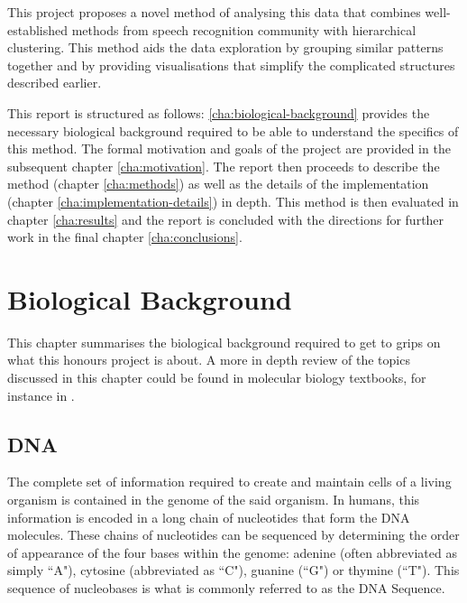 \documentclass[parskip]{cs4rep}
\begin{document}
This project proposes a novel method of analysing this data that combines well-established methods from speech recognition community with hierarchical clustering. This method aids the data exploration by grouping similar patterns together and by providing visualisations that simplify the complicated structures described earlier.

This report is structured as follows: \autoref{cha:biological-background} provides the necessary biological background required to be able to understand the specifics of this method. The formal motivation and goals of the project are provided in the subsequent chapter \ref{cha:motivation}. 
The report then proceeds to describe the method (chapter \ref{cha:methods}) as well as the details of the implementation (chapter \ref{cha:implementation-details}) in depth. 
This method is then evaluated in chapter \ref{cha:results} and the report is concluded with the directions for further work in the final chapter \ref{cha:conclusions}.

\chapter{Biological Background}
\label{cha:biological-background}
This chapter summarises the biological background required to get to grips on what this honours project is about. 
A more in depth review of the topics discussed in this chapter could be found in molecular biology textbooks, for instance in \cite{Alberts:2002te}.

\section{DNA}

The complete set of information required to create and maintain cells of a
living organism is contained in the genome of the said organism. In humans, this
information is encoded in a long chain of nucleotides that form the DNA molecules. 
These chains of nucleotides can be sequenced by determining the order of appearance
of the four bases within the genome: adenine (often abbreviated as simply ``A"), cytosine (abbreviated as ``C"),
guanine (``G") or thymine (``T").
This sequence of nucleobases is what is commonly referred to as the DNA Sequence. 
\end{document}
